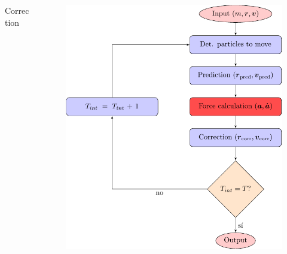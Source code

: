 \begin{frame}
\begin{columns}
\begin{column}{0.5\textwidth}
\begin{block}{Correction}
        \end{block}
        \end{column}
        \begin{column}{0.5\textwidth}
            \begin{figure}
                \centering
                \includegraphics[height=0.7\textheight]{diagrams/algorithm}
                \label{fig:algoritmo}
            \end{figure}
        \end{column}
    \end{columns}
\end{frame}


%

